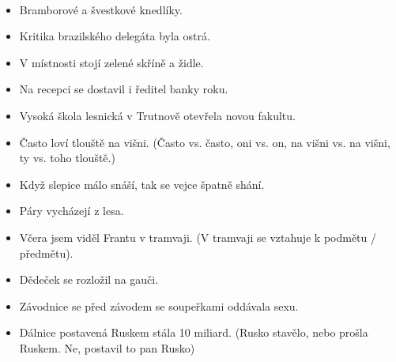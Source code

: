 \documentclass[12pt]{article}					%
\begin{document}
\begin{poznamka}
	\ 

	\vspace{-3em}

	\begin{itemize}
		\item Bramborové a švestkové knedlíky.
		\item Kritika brazilského delegáta byla ostrá.
		\item V místnosti stojí zelené skříně a židle.
		\item Na recepci se dostavil i ředitel banky roku.
		\item Vysoká škola lesnická v Trutnově otevřela novou fakultu.
		\item Často loví tlouště na višni. (Často vs. často, oni vs. on, na višni vs. na višni, ty vs. toho tlouště.)
		\item Když slepice málo snáší, tak se vejce špatně shání.
		\item Páry vycházejí z lesa.
		\item Včera jsem viděl Frantu v tramvaji. (V tramvaji se vztahuje k podmětu / předmětu).
		\item Dědeček se rozložil na gauči.
		\item Závodnice se před závodem se soupeřkami oddávala sexu.
		\item Dálnice postavená Ruskem stála 10 miliard. (Rusko stavělo, nebo prošla Ruskem. Ne, postavil to pan Rusko)
	\end{itemize}


\end{poznamka}
\end{document}
